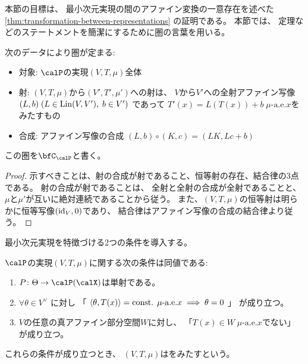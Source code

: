 \documentclass[report]{jlreq}
\begin{document}
本節の目標は、
最小次元実現の間のアファイン変換の一意存在を述べた
\cref{thm:transformation-between-representations}
の証明である。
本節では、
定理などのステートメントを簡潔にするために圏の言葉を用いる。

\begin{propdef}
    次のデータにより圏が定まる:
    \begin{itemize}
        \item 対象: $\calP$の実現$(V, T, \mu)$全体
        \item 射: $(V, T, \mu)$から$(V', T', \mu')$への射は、
            $V$から$V'$への全射アファイン写像
            $(L, b) \; (L \in \operatorname{Lin}(V, V'), \; b \in V')$
            であって
            $T'(x) = L(T(x)) + b \; \text{$\mu$-a.e.$x$}$をみたすもの
        \item 合成: アファイン写像の合成
            $(L, b) \circ (K, c) = (LK, Lc + b)$
    \end{itemize}
    この圏を$\bfC_\calP$と書く。
\end{propdef}

\begin{proof}
    示すべきことは、射の合成が射であること、恒等射の存在、結合律の3点である。
    射の合成が射であることは、
    全射と全射の合成が全射であることと、
    $\mu$と$\mu'$が互いに絶対連続であることから従う。
    また、$(V, T, \mu)$の恒等射は明らかに恒等写像$(\mathrm{id}_V, 0)$であり、
    結合律はアファイン写像の合成の結合律より従う。
\end{proof}

最小次元実現を特徴づける2つの条件を導入する。

\begin{propdef}[条件A]
    $\calP$の実現$(V, T, \mu)$に関する次の条件は同値である:
    \begin{enumerate}
        \item $P \colon \Theta \to \calP(\calX)$は単射である。
        \item $\forall \theta \in V^\vee$
            に対し
            「
                $\left\langle{\theta},{T(x)}\right\rangle = \text{const. $\mu$-a.e.$x$}
                \implies
                \theta = 0$
            」
            が成り立つ。
        \item $V$の任意の真アファイン部分空間$W$に対し、
            「$T(x) \in W \; \text{$\mu$-a.e.$x$}$でない」
            が成り立つ。
    \end{enumerate}
    これらの条件が成り立つとき、
    $(V, T, \mu)$はをみたすという。
\end{propdef}
\end{document}
